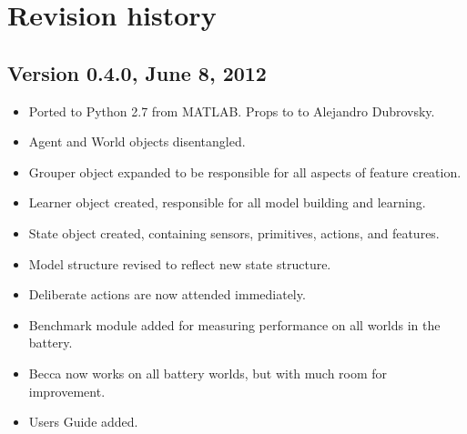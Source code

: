 \chapter{Revision history}

\section{Version 0.4.0, June 8, 2012}

\begin{itemize}
\item Ported to Python 2.7 from MATLAB. Props to to Alejandro Dubrovsky.
\item Agent and World objects disentangled.
\item Grouper object expanded to be responsible for all aspects of feature creation.
\item Learner object created, responsible for all model building and learning.
\item State object created, containing sensors, primitives, actions, and features.
\item Model structure revised to reflect new state structure.
\item Deliberate actions are now attended immediately.
\item Benchmark module added for measuring performance on all worlds in the battery.
\item Becca now works on all battery worlds, but with much room for improvement.
\item Users Guide added. 
\end{itemize}